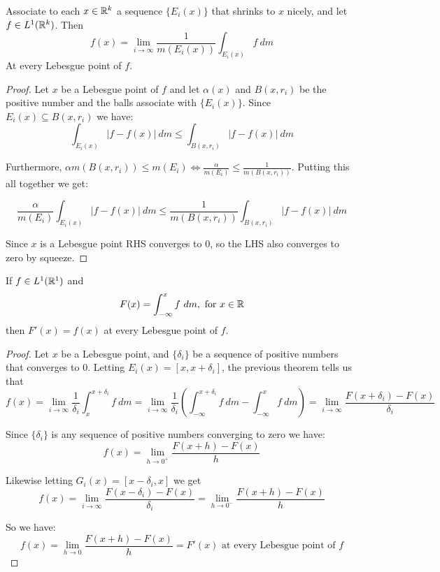 \begin{theorem}
    Associate to each $x\in \mathbb{R}^k$ a sequence $\{E_i(x)\}$ that shrinks to $x$ nicely, and let $f\in L^1(\mathbb{R}^k)$. Then \[f(x) = \lim_{i\rightarrow \infty}\frac{1}{m(E_i(x))}\int_{E_i(x)} f~dm \]
    At every Lebesgue point of $f$.

    \begin{proof}
        Let $x$ be a Lebesgue point of $f$ and let $\alpha(x)$ and $B(x,r_i)$ be the positive number and the balls associate with $\{E_i(x)\}$. Since $E_i(x)\subseteq B(x,r_i)$ we have:
        \[\int_{E_i(x)}|f-f(x)|~dm \leq \int_{B(x,r_i)}|f-f(x)|~dm \]

        Furthermore, $\alpha m(B(x,r_i))\leq m(E_i) \iff \frac{\alpha}{m(E_i)}\leq \frac{1}{m(B(x,r_i))}$. Putting this all together we get:

        \[\frac{\alpha}{m(E_i)}\int_{E_i(x)}|f-f(x)|~dm \leq \frac{1}{m(B(x,r_i))}\int_{B(x,r_i)}|f-f(x)|~dm\]

        Since $x$ is a Lebesgue point RHS converges to $0$, so the LHS also converges to zero by squeeze.
    \end{proof}
\end{theorem}

\begin{corollary}
    If $f\in L^1(\mathbb{R}^1)$ and \[F(x) = \int_{-\infty}^x f~dm, \text{ for }x\in \mathbb{R}\]
    then $F'(x) = f(x)$ at every Lebesgue point of $f$.

    \begin{proof}
        Let $x$ be a Lebesgue point, and $\{\delta_i\}$ be a sequence of positive numbers that converges to $0$. Letting $E_i(x) = [x,x+\delta_i]$, the previous theorem tells us that 
        \[f(x) = \lim_{i\rightarrow\infty} \frac{1}{\delta_i}\int_{x}^{x+\delta_i}f~dm = \lim_{i\rightarrow\infty}\frac{1}{\delta_i}(\int_{-\infty}^{x+\delta_i} f~dm - \int_{-\infty}^x f~dm) = \lim_{i\rightarrow\infty}\frac{F(x+\delta_i) - F(x)}{\delta_i} \]

        Since $\{\delta_i\}$ is any sequence of positive numbers converging to zero we have:\[f(x) = \lim_{h\rightarrow 0^+}\frac{F(x+h) - F(x)}{h}\]
        
        Likewise letting $G_i(x) = [x-\delta_i,x]$ we get \[f(x) = \lim_{i\rightarrow\infty}\frac{F(x-\delta_i) - F(x)}{\delta_i} = \lim_{h\rightarrow 0^-}\frac{F(x+h) - F(x)}{h} \]
    

        So we have:\[f(x) = \lim_{h\rightarrow 0}\frac{F(x+h) - F(x)}{h} = F'(x) \text{ at every Lebesgue point of }f\]
    \end{proof}
\end{corollary}

